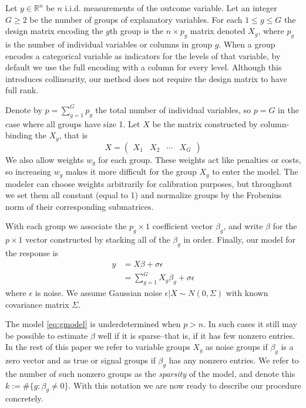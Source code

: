 \documentclass{imsart}
\newcommand{\real}{\mathbb{R}}
\begin{document}
Let $y \in \real^n$ be $n$ i.i.d. measurements of the outcome variable.
Let an integer $G \geq 2$ be the number of groups of explanatory variables.
For each $1 \leq g \leq G$ the design matrix encoding the
$g$th group is the $n \times p_g$ matrix denoted $X_g$, where $p_g$ is
the number of individual variables or columns in group $g$.
When a group encodes a categorical variable as indicators for the
levels of that variable, by default we use the full encoding with a
column for every level. Although this introduces collinearity, our method
does not require the design matrix to have full rank.

Denote by $p = \sum_{g=1}^Gp_g$
the total number of individual variables, so $p = G$ in the
case where all groups have size 1. Let $X$ be the matrix constructed
by column-binding the $X_g$, that is  
\begin{equation*}
X = \begin{pmatrix} X_1 & X_2 & \cdots & X_G  \end{pmatrix}
\end{equation*}
We also allow weights $w_g$ for each group. These
weights act like penalties or costs, so increasing $w_g$ makes it
more difficult for the group $X_g$ to enter the model. The
modeler can choose weights arbitrarily for calibration purposes,
but throughout we set them all constant (equal to 1) and normalize
groups by the Frobenius norm of their corresponding submatrices.

With each group we associate the $p_g \times 1$ coefficient vector
$\beta_g$, and write $\beta$ for the $p \times 1$ vector constructed
by stacking all of the $\beta_g$ in order.  Finally, our model for the
response is
\begin{equation}
\begin{aligned}
\label{eq:gmodel}
y & = X \beta + \sigma \epsilon \\
   & = \sum_{g=1}^G X_g \beta_g + \sigma \epsilon
\end{aligned}
\end{equation}
where $\epsilon$ is noise. We assume Gaussian noise
$\epsilon | X \sim N(0, \Sigma)$ with known covariance matrix $\Sigma$.

The model \eqref{eq:gmodel} is underdetermined when $p > n$.
In such cases it still may be possible to
estimate $\beta$ well if it is sparse--that is, if it has few nonzero
entries. In the rest of this paper we refer to variable groups $X_g$
as noise groups if $\beta_g$ is a zero vector and as true or signal
groups if $\beta_g$ has any nonzero entries. We refer to the number
of such nonzero groups as the \textit{sparsity} of the model, and
denote this $k := \# \{ g : \beta_g \neq 0 \}$. With this notation
we are now ready to describe our procedure concretely.
\end{document}

